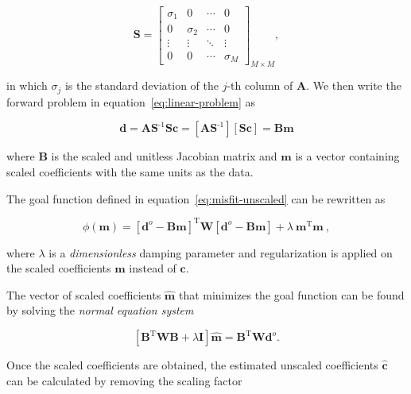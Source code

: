 \documentclass[twocolumn]{article}
\newcommand{\inv}{^{\text{-}1}}
\newcommand{\trans}{^{\text{T}}}
\begin{document}
\begin{equation}
    \mathbf{S} =
    \begin{bmatrix}
      \sigma_1 & 0 & \cdots &0 \\
      0 & \sigma_2 & \cdots &0 \\
      \vdots & \vdots & \ddots & \vdots \\
      0  & 0 & \cdots & \sigma_M
    \end{bmatrix}_{M \times M}
    ,
\end{equation}

\noindent in which $\sigma_j$ is the standard deviation of the $j$-th column of
$\mathbf{A}$.
We then write the forward problem in equation~\ref{eq:linear-problem} as

\begin{equation}
    \mathbf{d}
    =
    \mathbf{A} \mathbf{S}\inv \mathbf{S} \mathbf{c}
    =
    \left[
        \mathbf{A} \mathbf{S}\inv
    \right]
    \left[
        \mathbf{S} \mathbf{c}
    \right]
    =
    \mathbf{B} \mathbf{m}
\end{equation}

\noindent where $\mathbf{B}$ is the scaled and unitless Jacobian matrix and
$\mathbf{m}$ is a vector containing scaled coefficients with the same units as
the data.

The goal function defined in equation~\ref{eq:misfit-unscaled} can be
rewritten as

\begin{equation}
    \phi(\mathbf{m}) =
    \left[\mathbf{d}^o - \mathbf{B}\mathbf{m}\right]\trans
    \mathbf{W}
    \left[\mathbf{d}^o - \mathbf{B}\mathbf{m}\right]
    + \lambda\ \mathbf{m}\trans\mathbf{m}
    \ ,
    \label{eq:misfit}
\end{equation}

\noindent where $\lambda$ is a \emph{dimensionless} damping parameter and
regularization is applied on the scaled coefficients $\mathbf{m}$ instead of
$\mathbf{c}$.

The vector of scaled coefficients $\hat{\mathbf{m}}$ that minimizes the goal
function can be found by solving the \emph{normal equation system}
\citep{menke1989}

\begin{equation}
    \left[
      \mathbf{B}\trans \mathbf{W} \mathbf{B} + \lambda \mathbf{I}
    \right]
    \hat{\mathbf{m}} =
    \mathbf{B}\trans\mathbf{W}
    \mathbf{d}^o.
\end{equation}

Once the scaled coefficients are obtained, the estimated unscaled coefficients
$\hat{\mathbf{c}}$ can be calculated by removing the scaling factor
\end{document}

